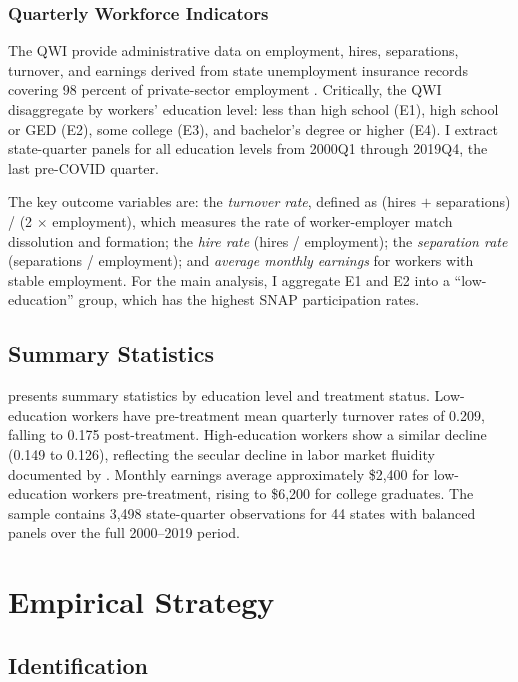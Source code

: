 \documentclass[12pt]{article}
\begin{document}
\subsubsection*{Quarterly Workforce Indicators} The QWI provide administrative data on employment, hires, separations, turnover, and earnings derived from state unemployment insurance records covering 98 percent of private-sector employment \citep{abowd2009lehd}. Critically, the QWI disaggregate by workers' education level: less than high school (E1), high school or GED (E2), some college (E3), and bachelor's degree or higher (E4). I extract state-quarter panels for all education levels from 2000Q1 through 2019Q4, the last pre-COVID quarter.

The key outcome variables are: the \emph{turnover rate}, defined as (hires $+$ separations) / (2 $\times$ employment), which measures the rate of worker-employer match dissolution and formation; the \emph{hire rate} (hires / employment); the \emph{separation rate} (separations / employment); and \emph{average monthly earnings} for workers with stable employment. For the main analysis, I aggregate E1 and E2 into a ``low-education'' group, which has the highest SNAP participation rates.

\subsection{Summary Statistics}



 presents summary statistics by education level and treatment status. Low-education workers have pre-treatment mean quarterly turnover rates of 0.209, falling to 0.175 post-treatment. High-education workers show a similar decline (0.149 to 0.126), reflecting the secular decline in labor market fluidity documented by \citet{davis2012labor}. Monthly earnings average approximately \$2,400 for low-education workers pre-treatment, rising to \$6,200 for college graduates. The sample contains 3,498 state-quarter observations for 44 states with balanced panels over the full 2000--2019 period.

\section{Empirical Strategy}

\subsection{Identification}
\end{document}
